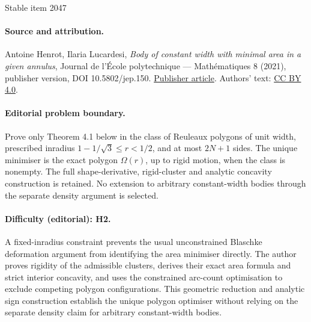 \documentclass[11pt]{article}
\numberwithin{equation}{section}
\begin{document}
\begin{center}{\Large Stable item 2047}\end{center}
\paragraph{Source and attribution.}
Antoine Henrot, Ilaria Lucardesi, \emph{Body of constant width with minimal area in a given annulus}, Journal de l’École polytechnique — Mathématiques 8 (2021), publisher version, DOI 10.5802/jep.150. \href{https://jep.centre-mersenne.org/articles/10.5802/jep.150/}{Publisher article}. Authors' text: \href{https://creativecommons.org/licenses/by/4.0/}{CC BY 4.0}.
\paragraph{Editorial problem boundary.}
Prove only Theorem 4.1 below in the class of Reuleaux polygons of unit width, prescribed inradius \(1-1/\sqrt3\le r<1/2\), and at most \(2N+1\) sides. The unique minimiser is the exact polygon \(\Omega(r)\), up to rigid motion, when the class is nonempty. The full shape-derivative, rigid-cluster and analytic concavity construction is retained. No extension to arbitrary constant-width bodies through the separate density argument is selected.
\paragraph{Difficulty (editorial): H2.}
A fixed-inradius constraint prevents the usual unconstrained Blaschke deformation argument from identifying the area minimiser directly. The author proves rigidity of the admissible clusters, derives their exact area formula and strict interior concavity, and uses the constrained arc-count optimisation to exclude competing polygon configurations. This geometric reduction and analytic sign construction establish the unique polygon optimiser without relying on the separate density claim for arbitrary constant-width bodies.
\end{document}
